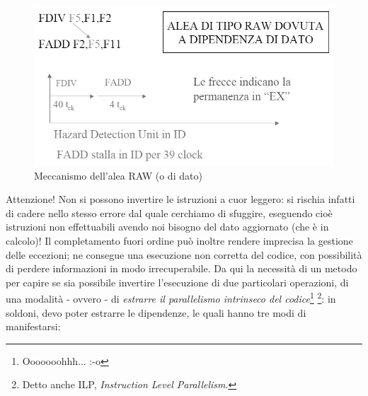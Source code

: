 \begin{figure}[!h]
\centering
\includegraphics[width=0.7\columnwidth]{img/aleaDato}
\caption{Meccanismo dell'alea RAW (o di dato)}
\label{fig:aleaDato}
\end{figure}

Attenzione! Non si possono invertire le istruzioni a cuor leggero: si rischia infatti di cadere nello stesso errore dal quale cerchiamo di sfuggire, eseguendo cioè istruzioni non effettuabili avendo noi bisogno del dato aggiornato (che è in calcolo)! Il completamento fuori ordine può inoltre rendere imprecisa la gestione delle
eccezioni; ne consegue una esecuzione non corretta del codice, con possibilità di perdere informazioni in modo irrecuperabile. Da qui la necessità di un metodo per capire se sia possibile invertire l'esecuzione di due particolari operazioni, di una modalità - ovvero - di \emph{estrarre il parallelismo intrinseco del codice}\footnote{Ooooooohhh... :-o} \footnote{Detto anche ILP, \textit{Instruction Level Parallelism}.}: in soldoni, devo poter estrarre le dipendenze, le quali hanno tre modi di manifestarsi:
